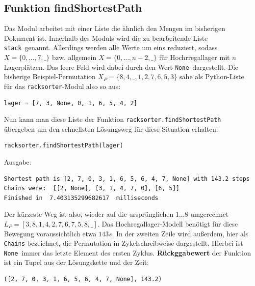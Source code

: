 \documentclass{fh-ium-bama}
\newcommand{\racksorter}{\lstinline|racksorter|}
\newcommand{\stack}{\lstinline|stack|}
\newcommand{\None}{\lstinline|None|}
\begin{document}
\subsection{Funktion findShortestPath}
Das Modul arbeitet mit einer Liste die ähnlich den Mengen im bisherigen Dokument ist. Innerhalb des Moduls wird die zu bearbeitende Liste \stack\ genannt. 
Allerdings werden alle Werte um eins reduziert, sodass $X = \{0, \dots, 7, \_\}$ bzw.{} allgemein $X = \{0, \dots, n-2, \_\}$ für Hochrregallager mit $n$ Lagerplätzen. Das leere Feld wird dabei durch den Wert \None\ dargestellt.
Die bisherige Beispiel-Permutation $X_P = \{8, 4, \_, 1, 2, 7, 6, 5, 3\}$ sähe als Python-Liste für das \racksorter{}-Modul also so aus:
\begin{lstlisting}
lager = [7, 3, None, 0, 1, 6, 5, 4, 2]
\end{lstlisting}
Nun kann man diese Liste der Funktion \lstinline|racksorter.findShortestPath| übergeben um den schnellsten Lösungsweg für diese Situation erhalten:
\begin{lstlisting}
racksorter.findShortestPath(lager)
\end{lstlisting}
Ausgabe:
\begin{lstlisting}
Shortest path is [2, 7, 0, 3, 1, 6, 5, 6, 4, 7, None] with 143.2 steps
Chains were:  [[2, None], [3, 1, 4, 7, 0], [6, 5]]
Finished in  7.403135299682617  milliseconds
\end{lstlisting}
Der kürzeste Weg ist also, wieder auf die ursprünglichen $1\dots8$ umgerechnet $L_P = [3, 8, 1, 4, 2, 7, 6, 7, 5, 8, \_]$. Das Hochregallager-Modell benötigt für diese Bewegung voraussichtlich etwa $143s$.
In der zweiten Zeile wird außerdem, hier als \lstinline|Chains| bezeichnet, die Permutation in Zykelschreibweise dargestellt. Hierbei ist \None\ immer das letzte Element des ersten Zyklus.
\textbf{Rückggabewert} der Funktion ist ein Tupel aus der Lösungskette und der Zeit:
\begin{lstlisting}
([2, 7, 0, 3, 1, 6, 5, 6, 4, 7, None], 143.2)
\end{lstlisting}
\end{document}
